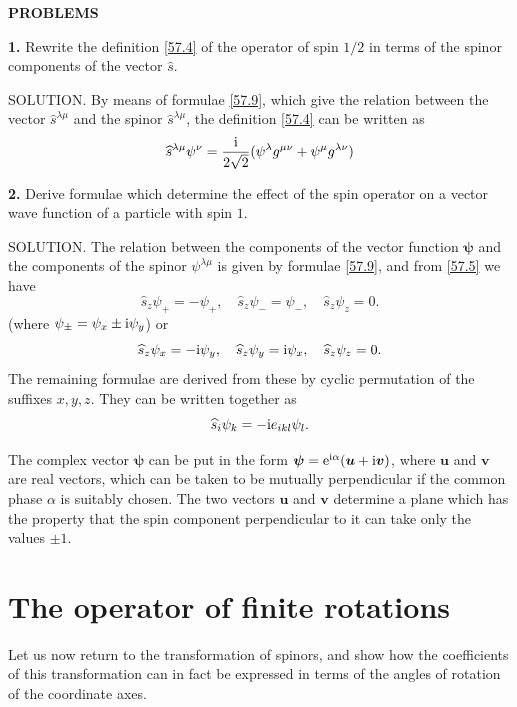 {\small
	
\textbf{PROBLEMS}


\textbf{1.} Rewrite the definition \eqref{57.4} of the operator of spin $ 1/2 $ in terms of the spinor components of the vector $\hat{s}$.





SOLUTION. By means of formulae \eqref{57.9}, which give the relation between the vector $\hat{s}^{\lambda\mu}$ and the spinor $\hat{s}^{\lambda\mu}$, the definition \eqref{57.4} can be written as
\[ \widehat{s}^{\lambda\mu}\psi^\nu=\frac{\mathrm{i}}{2\sqrt{2}}(\psi^\lambda g^{\mu\nu}+\psi^\mu g^{\lambda\nu}) \]




\textbf{2.} Derive formulae which determine the effect of the spin operator on a vector wave function of a particle with spin $ 1 $.





SOLUTION. The relation between the components of the vector function $ \bm{\psi} $ and the components of the spinor $\psi^{\lambda\mu}$ is given by formulae \eqref{57.9}, and from \eqref{57.5} we have
\[ \hat{s}_z\psi_+=-\psi_+,\quad\hat{s}_z\psi_-=\psi_-,\quad\hat{s}_z\psi_z=0. \]
(where $ \psi_\pm=\psi_x\pm\mathrm{i}\psi_y $) or
\[ \widehat{s}_z\psi_x=-\mathrm{i}\psi_y,\quad\widehat{s}_z\psi_y=\mathrm{i}\psi_x,\quad\widehat{s}_z\psi_z=0.  \] 
The remaining formulae are derived from these by cyclic permutation of the suffixes $ x, y, z $. They can be written together as
\[ \widehat{s}_i\psi_k=-\mathrm{i} e_{ikl}\psi_l. \]



The complex vector $ \bm{\psi} $ can be put in the form $ \bm{\psi}= \mathrm{e}^{\mathrm{i}\alpha}(\bm{u} + \mathrm{i}\bm{v}) $, where $ \bm{u} $ and $ \bm{v} $ are real vectors, which can be taken to be mutually perpendicular if the common phase $ \alpha $ is suitably chosen. The two vectors $ \bm{u} $ and $ \bm{v} $ determine a plane which has the property that the spin component perpendicular to it can take only the values $ \pm1 $.}



\section{The operator of finite rotations}\label{The operator of finite rotations}
Let us now return to the transformation of spinors, and show how the coefficients of this transformation can in fact be expressed in terms of the angles of rotation of the coordinate axes.

